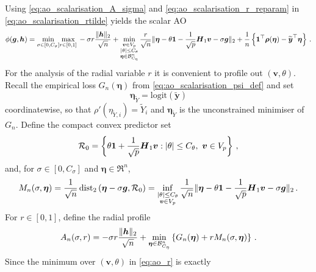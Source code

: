 \documentclass{article}
\makeatletter
\theoremstyle{definition}
\newcommand{\vnorm}[1]{%
	\ensuremath{%
		\if@display
		\left\| #1 \right\|
		\else
		\| #1 \|
		\fi
	}%
}
\newcommand{\abs}[1]{%
	\ensuremath{%
		\if@display
		\left| #1 \right|
		\else
		\lvert #1 \rvert
		\fi
	}%
}
\newcommand*{\bb}{\boldsymbol}
\newcommand{\logit}[1]{\ensuremath{\textrm{logit}(#1)}}
\def\bH {\bb{H}}
\def\bv{\bb{v}}
\def\bh{\bb{h}}
\def\bg{\bb{g}}
\def\Ytil{\widetilde{Y}}
\def\bYtil{\widetilde{\bb{y}}}
\def\bEtaYtil{\bb{\eta}_{\Ytil}}
\def\bH{\bb{H}}
\makeatother
\begin{document}
\begin{bibunit}
Using \eqref{eq:ao_scalarisation_A_sigma} and \eqref{eq:ao_scalarisation_r_reparam} in \eqref{eq:ao_scalarisation_rtilde} yields the scalar AO
\begin{equation}
	\label{eq:ao_r}
	\begin{aligned}
		\phi(\bg,\bh)
		=
		\underset{\sigma\in[0,C_\sigma]}{\min}
		\underset{r\in[0,1]}{\max} \,
			-
			\sigma r
			\frac{\vnorm{\bh}_2}{\sqrt n}
			+
			\underset{
				\substack{
					\bv\in V_p\\
					\abs{\theta}\leq C_\theta\\
					\bb\eta\in\mathcal B^n_{C_\eta}
				}
			}{\min} \,
				\frac{r}{\sqrt n}
				\vnorm{
					\bb\eta
					-
					\theta\bb 1
					-
					\frac{1}{\sqrt p}
					\bH_1\bv
					-
					\sigma\bg
				}_2
				+
				\frac{1}{n}
				\left\{
					\bb 1^\top\bb\rho(\bb\eta)
					-
					\bYtil^\top\bb\eta
				\right\}
		 \,.
	\end{aligned}
\end{equation}
For the analysis of the radial variable $r$ it is convenient to profile
out $(\bv,\theta)$. Recall the empirical loss $G_n(\bb\eta)$ from
\eqref{eq:ao_scalarisation_psi_def} and set
$$
	\bEtaYtil
	=
	\logit{\bYtil}
$$
coordinatewise, so that $\rho'(\eta_{\Ytil,i})=\Ytil_i$ and
$\bEtaYtil$ is the unconstrained minimiser of $G_n$. Define the compact
convex predictor set
$$
	\mathcal R_0
	=
	\left\{
		\theta\bb1
		+
		\frac1{\sqrt p}\bH_1\bv:
		\abs{\theta}\leq C_\theta,
		\ \bv\in V_p
	\right\}\,,
$$
and, for $\sigma\in[0,C_\sigma]$ and $\bb\eta\in\Re^n$,
$$
	M_n(\sigma,\bb\eta)
	=
	\frac1{\sqrt n}
	\operatorname{dist}_2
	\left(
		\bb\eta-\sigma\bg,
		\mathcal R_0
	\right)
	=
	\underset{\substack{\abs{\theta}\leq C_\theta\\ \bv\in V_p}}{\inf}\,
	\frac1{\sqrt n}
	\vnorm{
		\bb\eta-\theta\bb1-\frac1{\sqrt p}\bH_1\bv-\sigma\bg
	}_2\,.
$$
For $r\in[0,1]$, define the radial profile
\begin{equation}
\label{eq:radial_AO_profile}
	A_n(\sigma,r)
	=
	-\sigma r\frac{\vnorm{\bh}_2}{\sqrt n}
	+
	\underset{\bb\eta\in\mathcal B^n_{C_\eta}}{\min}
	\left\{
		G_n(\bb\eta)
		+
		rM_n(\sigma,\bb\eta)
	\right\}\,.
\end{equation}
Since the minimum over $(\bv,\theta)$ in \eqref{eq:ao_r} is exactly

\end{bibunit}
\end{document}
